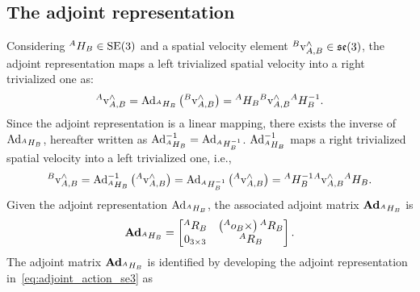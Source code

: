 \subsection{The adjoint representation} 
Considering ${}^A H _B \in {\mathrm{SE}}(3)$ and a spatial velocity element ${}^B \mathrm{v}_{A,B} ^\wedge \in \mathfrak{se}(3)$, the adjoint representation maps a left trivialized spatial velocity into a right trivialized one as: 
\begin{equation}
\label{eq:adjoint_action_se3}
    {}^A \mathrm{v}_{A,B} ^\wedge = \operatorname{Ad}_{{}^A H _B }\left({}^B \mathrm{v}_{A,B}^\wedge\right) = {}^A H _B {}^B \mathrm{v}_{A,B}^\wedge {}^A H _B^ {-1}.
\end{equation}
Since the adjoint representation is a linear mapping, there exists the inverse of $\operatorname{Ad}_{{}^A H _B}$, hereafter written as $\operatorname{Ad}_{{}^A H _B } ^{-1} = \operatorname{Ad}_{{}^A H _B ^{-1}}$. $\operatorname{Ad}_{{}^A H _B } ^{-1}$ maps a right trivialized spatial velocity into a left trivialized one, i.e.,
\begin{equation}
    {}^B \mathrm{v}_{A,B} ^\wedge = \operatorname{Ad}_{{}^A H _B }^{-1}\left({}^A \mathrm{v}_{A,B}^\wedge\right) =  \operatorname{Ad}_{{}^A H _B ^{-1} }\left({}^A \mathrm{v}_{A,B}^\wedge\right) = {}^A H _B ^{-1} {}^A \mathrm{v}_{A,B}^\wedge {}^A H _B.
\end{equation}
Given the adjoint representation $\operatorname{Ad}_{{}^A H _B }$, the associated adjoint matrix $\operatorname{\mathbf{Ad}}_{{}^A H _B }$ is
\begin{equation}
\label{eq:adjoint_matrix_se3_def}
    \operatorname{\mathbf{Ad}}_{{}^A H _B } =
    \begin{bmatrix}
    {}^A R_B & \left({}^A o_B \times\right) {}^A R_B  \\
     0_{3\times3} & {}^A R_B 
    \end{bmatrix}.
\end{equation}
The adjoint matrix $\operatorname{\mathbf{Ad}}_{{}^A H _B }$ is identified by developing the adjoint representation in~\eqref{eq:adjoint_action_se3} as
